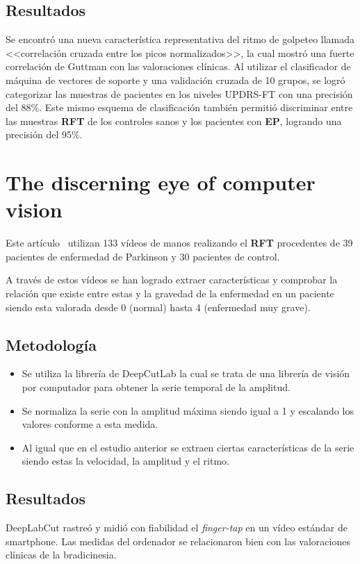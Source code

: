 \subsection{Resultados}
Se encontró una nueva característica representativa del ritmo de golpeteo llamada <<correlación cruzada entre los picos normalizados>>, la cual mostró una fuerte correlación de Guttman con las valoraciones clínicas. Al utilizar el clasificador de máquina de vectores de soporte y una validación cruzada de 10 grupos, se logró categorizar las muestras de pacientes en los niveles UPDRS-FT con una precisión del 88\%. Este mismo esquema de clasificación también permitió discriminar entre las muestras \textbf{RFT} de los controles sanos y los pacientes con \textbf{EP}, logrando una precisión del 95\%.


\section{The discerning eye of computer vision}
Este artículo~\cite{williams2020discerning} utilizan 133 vídeos de manos realizando el \textbf{RFT} procedentes de 39 pacientes de enfermedad de Parkinson y 30 pacientes de control.

A través de estos vídeos se han logrado extraer características y comprobar la relación que existe entre estas y la gravedad de la enfermedad en un paciente siendo esta valorada desde 0 (normal) hasta 4 (enfermedad muy grave).


\subsection{Metodología}
\begin{itemize}


	\item Se utiliza la librería de DeepCutLab la cual se trata de una librería de visión por computador para obtener la serie temporal de la amplitud.
	\item Se normaliza la serie con la amplitud máxima siendo igual a 1 y escalando los valores conforme a esta medida.
	\item Al igual que en el estudio anterior se extraen ciertas características de la serie siendo estas la velocidad, la amplitud y el ritmo.
\end{itemize}
\subsection{Resultados}
DeepLabCut rastreó y midió con fiabilidad el \textit{finger-tap} en un vídeo estándar de smartphone. Las medidas del ordenador se relacionaron bien con las valoraciones clínicas de la bradicinesia.


